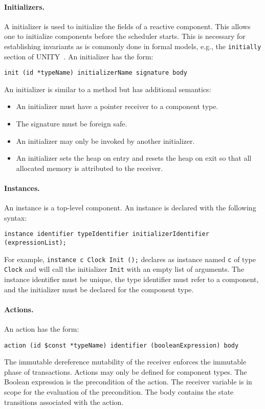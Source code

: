 \paragraph{Initializers.}
A initializer is used to initialize the fields of a reactive component.
This allows one to initialize components before the scheduler starts.
This is necessary for establishing invariants as is commonly done in formal models, e.g., the \verb+initially+ section of UNITY~\cite{chandy1989parallel}.
An initializer has the form:
\begin{verbatim}
init (id *typeName) initializerName signature body
\end{verbatim}
An initializer is similar to a method but has additional semantics:
\begin{itemize}
\item An initializer must have a pointer receiver to a component type.
\item The signature must be foreign safe.
\item An initializer may only be invoked by another initializer.
\item An initializer sets the heap on entry and resets the heap on exit so that all allocated memory is attributed to the receiver.
\end{itemize}

\paragraph{Instances.}
An instance is a top-level component.
An instance is declared with the following syntax:
\begin{verbatim}
instance identifier typeIdentifier initializerIdentifier (expressionList);
\end{verbatim}
For example, \verb+instance c Clock Init ();+ declares as instance named \verb+c+ of type \verb+Clock+ and will call the initializer \verb+Init+ with an empty list of arguments.
The instance identifier must be unique, the type identifier must refer to a component, and the initializer must be declared for the component type.

\paragraph{Actions.}
An action has the form:
\begin{verbatim}
action (id $const *typeName) identifier (booleanExpression) body
\end{verbatim}
The immutable dereference mutability of the receiver enforces the immutable phase of transactions.
Actions may only be defined for component types.
The Boolean expression is the precondition of the action.
The receiver variable is in scope for the evaluation of the precondition.
The body contains the state transitions associated with the action.

